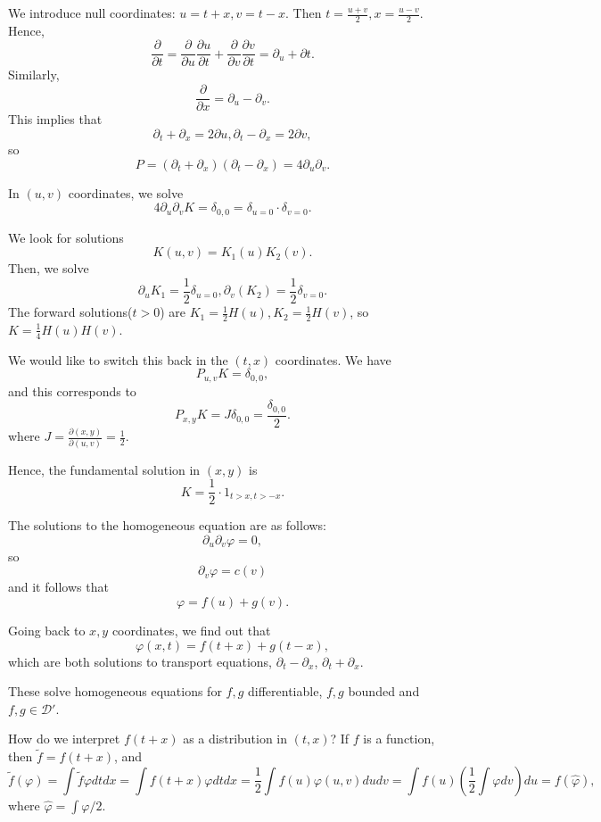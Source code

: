 \documentclass[11pt]{scrartcl}
\renewcommand{\hat}{\widehat}
\let \phi \varphi
\begin{document}
We introduce null coordinates: $u = t+x, v = t-x$.  Then $t = \frac{u+v}{2}, x = \frac{u-v}{2}.$  Hence,
$$\frac{\partial}{\partial t} = \frac{\partial}{\partial u} \frac{\partial u}{\partial t} + \frac{\partial}{\partial v}\frac{\partial v}{\partial t} = \partial_u + \partial t.$$
Similarly,
$$\frac{\partial}{\partial x} = \partial_u - \partial_v.$$
This implies that 
$$\partial_t + \partial_x = 2 \partial u, \partial_t - \partial_x = 2\partial v,$$
so $$P = (\partial_t + \partial_x)(\partial_t - \partial_x) = 4 \partial_u \partial_v.$$


In $(u, v)$ coordinates, we solve 
$$4 \partial_u\partial_v K = \delta_{0, 0} = \delta_{u = 0} \cdot \delta_{v = 0}.$$

We look for solutions 
$$K(u, v) = K_1(u) K_2(v).$$
Then, we solve 
$$\partial_u K_1 = \frac{1}{2} \delta_{u = 0}, \partial_v(K_2) = \frac{1}{2}\delta_{v = 0}.$$
The forward solutions($t > 0$) are $K_1 = \frac{1}{2}H(u), K_2 = \frac{1}{2}H(v)$, so $K = \frac{1}{4}H(u)H(v).$

We would like to switch this back in the $(t, x)$ coordinates.
We have $$P_{u, v} K = \delta_{0, 0},$$
and this corresponds to $$P_{x, y} K = J \delta_{0, 0} = \frac{\delta_{0, 0}}{2}.$$
where $J = \frac{\partial(x, y)}{\partial(u, v)} = \frac{1}{2}.$

Hence, the fundamental solution in $(x, y)$ is $$K = \frac{1}{2}\cdot 1_{t > x, t > -x}.$$

The solutions to the homogeneous equation are as follows: 
$$\partial_u \partial_v \phi = 0,$$
so $$\partial_v \phi = c(v)$$
and it follows that $$\phi = f(u) + g(v).$$

Going back to $x, y$ coordinates, we find out that $$\phi(x, t) = f(t + x) + g(t-x),$$
which are both solutions to transport equations, $\partial_t - \partial_x$, $\partial_t+ \partial_x$.

These solve homogeneous equations for $f, g$ differentiable, $f, g$ bounded and $f, g \in\mathcal D'$.  

How do we interpret $f(t+x)$ as a distribution in $(t, x)$?  If $f$ is a function, then 
$\tilde{f} = f(t+x)$, and 
$$\tilde f(\phi) = \int \tilde{f} \phi dtdx = \int f(t+x) \phi dtdx = \frac{1}{2}\int f(u)\phi(u, v)dudv = \int f(u) \left(\frac{1}{2}\int \phi dv\right)du = f(\hat \phi),$$
where $\hat \phi = \int \phi/2$.
\end{document}
